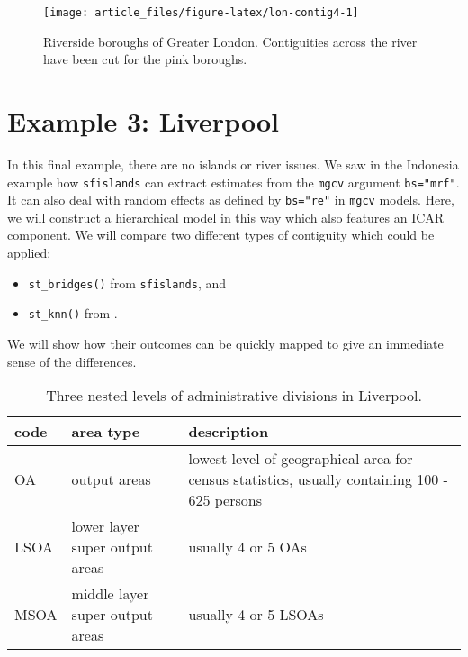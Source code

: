 \begin{figure}

{\centering \texttt{[image: article\_files/figure-latex/lon-contig4-1]} 

}

\caption{Riverside boroughs of Greater London. Contiguities across the river have been cut for the pink boroughs. }\label{fig:lon-contig4}
\end{figure}

\hypertarget{example-3-liverpool}{%
\section{Example 3: Liverpool}\label{example-3-liverpool}}

In this final example, there are no islands or river issues. We saw in the Indonesia example how \texttt{sfislands} can extract estimates from the \texttt{mgcv} argument \texttt{bs="mrf"}. It can also deal with random effects as defined by \texttt{bs="re"} in \texttt{mgcv} models. Here, we
will construct a hierarchical model in this way which also features an ICAR component. We will
compare two different types of contiguity which could be applied:

\begin{itemize}
\tightlist
\item
  \texttt{st\_bridges()} from \texttt{sfislands}, and
\item
  \texttt{st\_knn()} from .
\end{itemize}

We will show how their outcomes can be quickly mapped to give an immediate sense of the differences.

\begin{table}

\caption{\label{tab:livadmin-latex}Three nested levels of administrative divisions in Liverpool.}
\centering
\fontsize{8}{10}\selectfont
\begin{tabular}[t]{l|l|>{\raggedright\arraybackslash}p{7cm}}
\hline
code & area type & description\\
\hline
OA & output areas & lowest level of geographical area for census statistics, usually containing 100 - 625 persons\\
\hline
LSOA & lower layer super output areas & usually 4 or 5 OAs\\
\hline
MSOA & middle layer super output areas & usually 4 or 5 LSOAs\\
\hline
\end{tabular}
\end{table}

